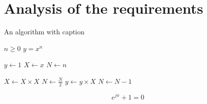 
\chapter{Analysis of the requirements}
\label{chp:requirements}

\begin{algorithm}[ht]
    \caption{An algorithm with caption}\label{alg:two}
    \begin{algorithmic}
        \REQUIRE $n \geq 0$
        \ENSURE $y = x^n$
        
        \STATE $y \gets 1$
        \STATE $X \gets x$
        \STATE $N \gets n$
        
              \STATE $X \gets X \times X$
              \STATE $N \gets \frac{N}{2} $  
              \STATE $y \gets y \times X$
              \STATE $N \gets N - 1$
            \ENDIF
        \ENDWHILE
    \end{algorithmic}
\end{algorithm}

\begin{equation}
e^{j\pi} + 1 = 0
\end{equation}